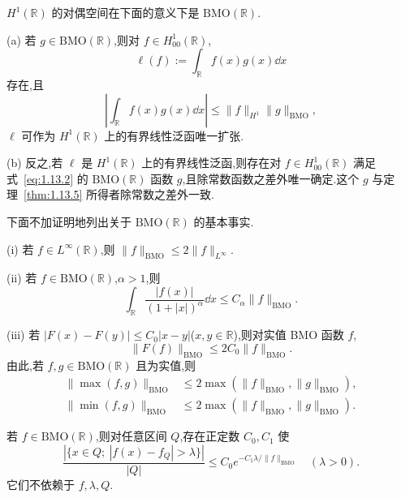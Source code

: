 \begin{theorem}\label{thm:1.13.6}
$H^{1}(\mathbb{R})$ 的对偶空间在下面的意义下是 $\mathrm{BMO}(\mathbb{R})$.

(a) 若 $g \in \mathrm{BMO}(\mathbb{R})$,则对 $f \in H_{00}^{1}(\mathbb{R})$,
\begin{equation}\tag{1.13.2}
\ell(f) := \int_{\mathbb{R}}f(x)g(x)\dd x
\label{eq:1.13.2}\end{equation}
存在,且
\begin{equation*}
\left|\int_{\mathbb{R}}f(x)g(x)\dd x\right| \leq \| f \|_{H^{1}}\| g \|_{\mathrm{BMO}},
\end{equation*}
$\ell$ 可作为 $H^{1}(\mathbb{R})$ 上的有界线性泛函唯一扩张.

(b) 反之,若 $\ell$ 是 $H^{1}(\mathbb{R})$ 上的有界线性泛函,则存在对 $f \in H_{00}^{1}(\mathbb{R})$ 满足式~\eqref{eq:1.13.2} 的 $\mathrm{BMO}(\mathbb{R})$ 函数 $g$,且除常数函数之差外唯一确定.这个 $g$ 与定理~\ref{thm:1.13.5} 所得者除常数之差外一致.
\end{theorem}

下面不加证明地列出关于 $\mathrm{BMO}(\mathbb{R})$ 的基本事实.

\begin{lemma}\label{lem:1.13.7}
(i) 若 $f \in L^{\infty}(\mathbb{R})$,则 $\| f \|_{\mathrm{BMO}} \leq 2\| f \|_{L^{\infty}}$.

(ii) 若 $f \in \mathrm{BMO}(\mathbb{R})$,$\alpha > 1$,则
\begin{equation*}
\int_{\mathbb{R}}\frac{|f(x)|}{(1 + |x|)^{\alpha}}\dd x \leq C_{\alpha}\| f \|_{\mathrm{BMO}}.
\end{equation*}

(iii) 若 $|F(x) - F(y)| \leq C_{0}|x - y|$($x, y \in \mathbb{R}$),则对实值 BMO 函数 $f$,
\begin{equation*}
\| F(f) \|_{\mathrm{BMO}} \leq 2C_{0}\| f \|_{\mathrm{BMO}}.
\end{equation*}
由此,若 $f, g \in \mathrm{BMO}(\mathbb{R})$ 且为实值,则
\begin{align*}
\| \max(f, g) \|_{\mathrm{BMO}} &\leq 2\max\left(\| f \|_{\mathrm{BMO}}, \| g \|_{\mathrm{BMO}}\right), \\
\| \min(f, g) \|_{\mathrm{BMO}} &\leq 2\max\left(\| f \|_{\mathrm{BMO}}, \| g \|_{\mathrm{BMO}}\right).
\end{align*}
\end{lemma}

\begin{theorem}\label{thm:1.13.8}
若 $f \in \mathrm{BMO}(\mathbb{R})$,则对任意区间 $Q$,存在正定数 $C_{0}, C_{1}$ 使
\begin{equation*}
\frac{\left|\{x \in Q;\ |f(x) - f_{Q}| > \lambda\}\right|}{|Q|} \leq C_{0}e^{-C_{1}\lambda/\| f \|_{\mathrm{BMO}}} \quad (\lambda > 0).
\end{equation*}
它们不依赖于 $f, \lambda, Q$.
\end{theorem}

